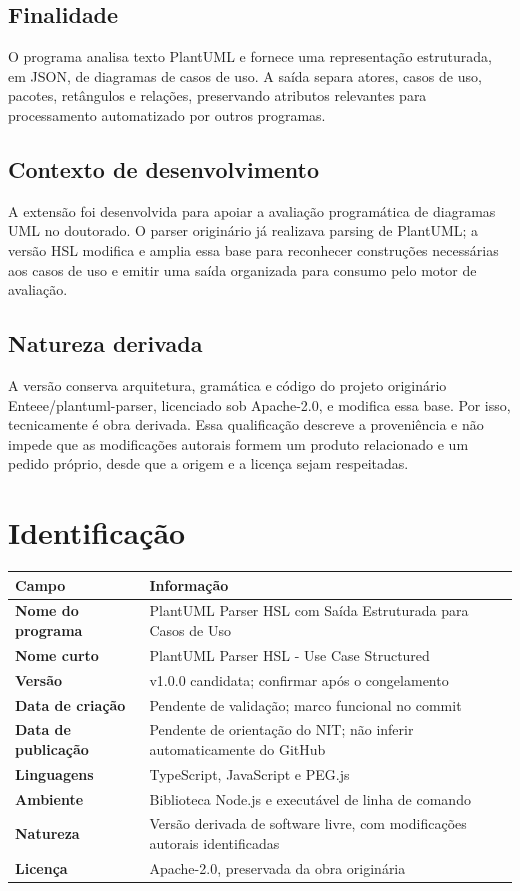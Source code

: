 \documentclass[11pt,a4paper]{article}
\newcommand{\code}[1]{\texttt{\detokenize{#1}}}
\begin{document}
\subsection{Finalidade}

O programa analisa texto PlantUML e fornece uma representação estruturada, em JSON, de diagramas de casos de uso. A saída separa atores, casos de uso, pacotes, retângulos e relações, preservando atributos relevantes para processamento automatizado por outros programas.

\subsection{Contexto de desenvolvimento}

A extensão foi desenvolvida para apoiar a avaliação programática de diagramas UML no doutorado. O parser originário já realizava parsing de PlantUML; a versão HSL modifica e amplia essa base para reconhecer construções necessárias aos casos de uso e emitir uma saída organizada para consumo pelo motor de avaliação.

\subsection{Natureza derivada}

A versão conserva arquitetura, gramática e código do projeto originário Enteee/\allowbreak plantuml-parser, licenciado sob Apache-2.0, e modifica essa base. Por isso, tecnicamente é obra derivada. Essa qualificação descreve a proveniência e não impede que as modificações autorais formem um produto relacionado e um pedido próprio, desde que a origem e a licença sejam respeitadas.

\section{Identificação}

\begin{longtable}{>{\bfseries}p{4.1cm}p{10.0cm}}
\toprule
Campo & Informação \\
\midrule
\endhead
Nome do programa & PlantUML Parser HSL com Saída Estruturada para Casos de Uso \\
Nome curto & PlantUML Parser HSL - Use Case Structured \\
Versão & v1.0.0 candidata; confirmar após o congelamento \\
Data de criação & Pendente de validação; marco funcional no commit \code{f317b79} \\
Data de publicação & Pendente de orientação do NIT; não inferir automaticamente do GitHub \\
Linguagens & TypeScript, JavaScript e PEG.js \\
Ambiente & Biblioteca Node.js e executável de linha de comando \\
Natureza & Versão derivada de software livre, com modificações autorais identificadas \\
Licença & Apache-2.0, preservada da obra originária \\
\bottomrule
\end{longtable}
\end{document}
